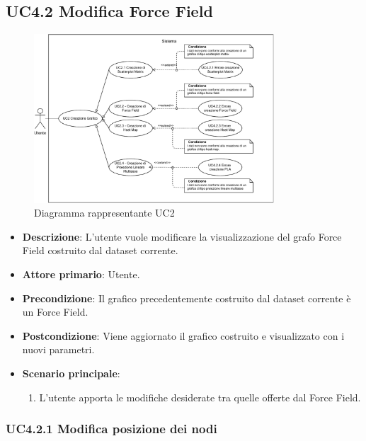 \subsection{UC4.2 Modifica Force Field}
\begin{figure}[h]
    \centering
    \includegraphics[width=0.8\textwidth]{componenti/casi-duso/diagrammi/UC2.pdf}
    \caption{Diagramma rappresentante UC2}
    \label{fig:UC2}
\end{figure}


\begin{itemize}
    \item \textbf{Descrizione}: L’utente vuole modificare la visualizzazione del grafo Force Field
                                costruito dal dataset corrente.
	
    \item \textbf{Attore primario}: Utente.
    
    \item \textbf{Precondizione}:   Il grafico precedentemente costruito dal dataset corrente è un Force Field.

    \item \textbf{Postcondizione}:  Viene aggiornato il grafico costruito e visualizzato con i nuovi parametri.

	\item \textbf{Scenario principale}:
		\begin{enumerate}
            \item L'utente apporta le modifiche desiderate tra quelle offerte dal Force Field.
        \end{enumerate}
\end{itemize}

\subsubsection{UC4.2.1 Modifica posizione dei nodi}

